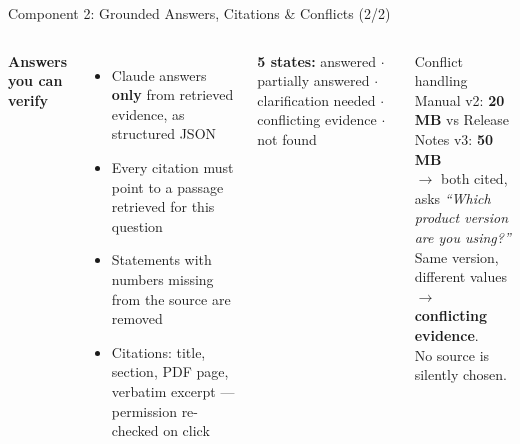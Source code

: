 \documentclass[aspectratio=169,11pt]{beamer}
\begin{document}
\begin{frame}{Component 2: Grounded Answers, Citations \& Conflicts \hfill{\normalsize\color{white}(2/2)}}
  \begin{columns}[T]
      \textbf{Answers you can verify}
      \begin{itemize}\small
        \item Claude answers \textbf{only} from retrieved evidence, as structured JSON
        \item Every citation must point to a passage retrieved for this question
        \item Statements with numbers missing from the source are removed
        \item Citations: title, section, PDF page, verbatim excerpt --- permission re-checked on click
      \end{itemize}
      \vspace{0.3em}
      {\scriptsize\textbf{5 states:} answered $\cdot$ partially answered $\cdot$ clarification needed $\cdot$ conflicting evidence $\cdot$ not found}
      \begin{alertblock}{Conflict handling}\small
        Manual v2: \textbf{20 MB} \;vs\; Release Notes v3: \textbf{50 MB}\\
        $\rightarrow$ both cited, asks \textit{``Which product version are you using?''}\\[0.4em]
        Same version, different values $\rightarrow$ \textbf{conflicting evidence}.\\
        No source is silently chosen.
      \end{alertblock}
  \end{columns}
\end{frame}
\end{document}
